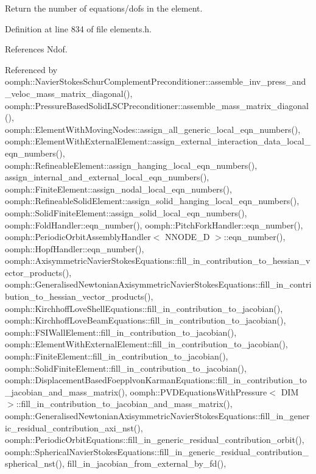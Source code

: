 Return the number of equations/dofs in the element. 



Definition at line 834 of file elements.\+h.



References Ndof.



Referenced by oomph\+::\+Navier\+Stokes\+Schur\+Complement\+Preconditioner\+::assemble\+\_\+inv\+\_\+press\+\_\+and\+\_\+veloc\+\_\+mass\+\_\+matrix\+\_\+diagonal(), oomph\+::\+Pressure\+Based\+Solid\+L\+S\+C\+Preconditioner\+::assemble\+\_\+mass\+\_\+matrix\+\_\+diagonal(), oomph\+::\+Element\+With\+Moving\+Nodes\+::assign\+\_\+all\+\_\+generic\+\_\+local\+\_\+eqn\+\_\+numbers(), oomph\+::\+Element\+With\+External\+Element\+::assign\+\_\+external\+\_\+interaction\+\_\+data\+\_\+local\+\_\+eqn\+\_\+numbers(), oomph\+::\+Refineable\+Element\+::assign\+\_\+hanging\+\_\+local\+\_\+eqn\+\_\+numbers(), assign\+\_\+internal\+\_\+and\+\_\+external\+\_\+local\+\_\+eqn\+\_\+numbers(), oomph\+::\+Finite\+Element\+::assign\+\_\+nodal\+\_\+local\+\_\+eqn\+\_\+numbers(), oomph\+::\+Refineable\+Solid\+Element\+::assign\+\_\+solid\+\_\+hanging\+\_\+local\+\_\+eqn\+\_\+numbers(), oomph\+::\+Solid\+Finite\+Element\+::assign\+\_\+solid\+\_\+local\+\_\+eqn\+\_\+numbers(), oomph\+::\+Fold\+Handler\+::eqn\+\_\+number(), oomph\+::\+Pitch\+Fork\+Handler\+::eqn\+\_\+number(), oomph\+::\+Periodic\+Orbit\+Assembly\+Handler$<$ N\+N\+O\+D\+E\+\_\+D $>$\+::eqn\+\_\+number(), oomph\+::\+Hopf\+Handler\+::eqn\+\_\+number(), oomph\+::\+Axisymmetric\+Navier\+Stokes\+Equations\+::fill\+\_\+in\+\_\+contribution\+\_\+to\+\_\+hessian\+\_\+vector\+\_\+products(), oomph\+::\+Generalised\+Newtonian\+Axisymmetric\+Navier\+Stokes\+Equations\+::fill\+\_\+in\+\_\+contribution\+\_\+to\+\_\+hessian\+\_\+vector\+\_\+products(), oomph\+::\+Kirchhoff\+Love\+Shell\+Equations\+::fill\+\_\+in\+\_\+contribution\+\_\+to\+\_\+jacobian(), oomph\+::\+Kirchhoff\+Love\+Beam\+Equations\+::fill\+\_\+in\+\_\+contribution\+\_\+to\+\_\+jacobian(), oomph\+::\+F\+S\+I\+Wall\+Element\+::fill\+\_\+in\+\_\+contribution\+\_\+to\+\_\+jacobian(), oomph\+::\+Element\+With\+External\+Element\+::fill\+\_\+in\+\_\+contribution\+\_\+to\+\_\+jacobian(), oomph\+::\+Finite\+Element\+::fill\+\_\+in\+\_\+contribution\+\_\+to\+\_\+jacobian(), oomph\+::\+Solid\+Finite\+Element\+::fill\+\_\+in\+\_\+contribution\+\_\+to\+\_\+jacobian(), oomph\+::\+Displacement\+Based\+Foepplvon\+Karman\+Equations\+::fill\+\_\+in\+\_\+contribution\+\_\+to\+\_\+jacobian\+\_\+and\+\_\+mass\+\_\+matrix(), oomph\+::\+P\+V\+D\+Equations\+With\+Pressure$<$ D\+I\+M $>$\+::fill\+\_\+in\+\_\+contribution\+\_\+to\+\_\+jacobian\+\_\+and\+\_\+mass\+\_\+matrix(), oomph\+::\+Generalised\+Newtonian\+Axisymmetric\+Navier\+Stokes\+Equations\+::fill\+\_\+in\+\_\+generic\+\_\+residual\+\_\+contribution\+\_\+axi\+\_\+nst(), oomph\+::\+Periodic\+Orbit\+Equations\+::fill\+\_\+in\+\_\+generic\+\_\+residual\+\_\+contribution\+\_\+orbit(), oomph\+::\+Spherical\+Navier\+Stokes\+Equations\+::fill\+\_\+in\+\_\+generic\+\_\+residual\+\_\+contribution\+\_\+spherical\+\_\+nst(), fill\+\_\+in\+\_\+jacobian\+\_\+from\+\_\+external\+\_\+by\+\_\+fd(), 